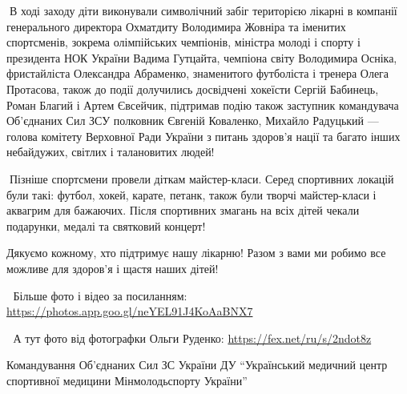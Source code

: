 🔹В ході заходу діти виконували символічний забіг територією лікарні в компанії
генерального директора Охматдиту Володимира Жовніра та іменитих спортсменів,
зокрема олімпійських чемпіонів, міністра молоді і спорту і президента НОК
України Вадима Гутцайта, чемпіона світу Володимира Осніка, фристайліста
Олександра Абраменко, знаменитого футболіста і тренера Олега Протасова, також
до події долучились досвідчені хокеїсти Сергій Бабинець, Роман Благий і Артем
Євсейчик, підтримав подію також заступник командувача Об'єднаних Сил ЗСУ
полковник Євгеній Коваленко, Михайло Радуцький — голова комітету Верховної Ради
України з питань здоров'я нації та багато інших небайдужих, світлих і
талановитих людей!💫

🔸Пізніше спортсмени провели діткам майстер-класи. Серед спортивних локацій
були такі: футбол, хокей, карате, петанк, також були творчі майстер-класи і
аквагрим для бажаючих. Після спортивних змагань на всіх дітей чекали подарунки,
медалі та святковий концерт!👏

Дякуємо кожному, хто підтримує нашу лікарню! Разом з вами ми робимо все можливе для здоров'я і щастя наших дітей!🤝

📸 Більше фото і відео за посиланням: \url{https://photos.app.goo.gl/neYEL91J4KoAaBNX7}

📸 А тут фото від фотографки Ольги Руденко: \url{https://fex.net/ru/s/2ndot8z}

Командування Об'єднаних Сил ЗС України ДУ \enquote{Український медичний центр спортивної медицини Мінмолодьспорту України}
